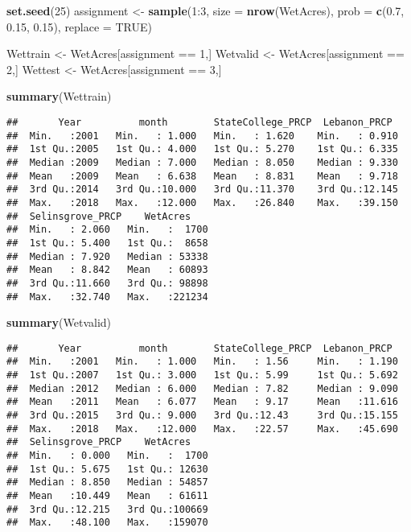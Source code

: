 \documentclass[]{article}
\newenvironment{Shaded}{\begin{snugshade}}{\end{snugshade}}
\newcommand{\KeywordTok}[1]{\textcolor[rgb]{0.13,0.29,0.53}{\textbf{{#1}}}}
\newcommand{\DataTypeTok}[1]{\textcolor[rgb]{0.13,0.29,0.53}{{#1}}}
\newcommand{\DecValTok}[1]{\textcolor[rgb]{0.00,0.00,0.81}{{#1}}}
\newcommand{\FloatTok}[1]{\textcolor[rgb]{0.00,0.00,0.81}{{#1}}}
\newcommand{\StringTok}[1]{\textcolor[rgb]{0.31,0.60,0.02}{{#1}}}
\newcommand{\OtherTok}[1]{\textcolor[rgb]{0.56,0.35,0.01}{{#1}}}
\newcommand{\NormalTok}[1]{{#1}}
\begin{document}
\begin{Shaded}
\begin{Highlighting}[]
\KeywordTok{set.seed}\NormalTok{(}\DecValTok{25}\NormalTok{)}
\NormalTok{assignment <-}\StringTok{ }\KeywordTok{sample}\NormalTok{(}\DecValTok{1}\NormalTok{:}\DecValTok{3}\NormalTok{, }\DataTypeTok{size =} \KeywordTok{nrow}\NormalTok{(WetAcres), }\DataTypeTok{prob =} \KeywordTok{c}\NormalTok{(}\FloatTok{0.7}\NormalTok{, }\FloatTok{0.15}\NormalTok{, }\FloatTok{0.15}\NormalTok{), }\DataTypeTok{replace =} \OtherTok{TRUE}\NormalTok{)}

\NormalTok{Wettrain <-}\StringTok{ }\NormalTok{WetAcres[assignment ==}\StringTok{ }\DecValTok{1}\NormalTok{,]}
\NormalTok{Wetvalid <-}\StringTok{ }\NormalTok{WetAcres[assignment ==}\StringTok{ }\DecValTok{2}\NormalTok{,]}
\NormalTok{Wettest <-}\StringTok{ }\NormalTok{WetAcres[assignment ==}\StringTok{ }\DecValTok{3}\NormalTok{,]}

\KeywordTok{summary}\NormalTok{(Wettrain)}
\end{Highlighting}
\end{Shaded}

\begin{verbatim}
##       Year          month        StateCollege_PRCP  Lebanon_PRCP   
##  Min.   :2001   Min.   : 1.000   Min.   : 1.620    Min.   : 0.910  
##  1st Qu.:2005   1st Qu.: 4.000   1st Qu.: 5.270    1st Qu.: 6.335  
##  Median :2009   Median : 7.000   Median : 8.050    Median : 9.330  
##  Mean   :2009   Mean   : 6.638   Mean   : 8.831    Mean   : 9.718  
##  3rd Qu.:2014   3rd Qu.:10.000   3rd Qu.:11.370    3rd Qu.:12.145  
##  Max.   :2018   Max.   :12.000   Max.   :26.840    Max.   :39.150  
##  Selinsgrove_PRCP    WetAcres     
##  Min.   : 2.060   Min.   :  1700  
##  1st Qu.: 5.400   1st Qu.:  8658  
##  Median : 7.920   Median : 53338  
##  Mean   : 8.842   Mean   : 60893  
##  3rd Qu.:11.660   3rd Qu.: 98898  
##  Max.   :32.740   Max.   :221234
\end{verbatim}

\begin{Shaded}
\begin{Highlighting}[]
\KeywordTok{summary}\NormalTok{(Wetvalid)}
\end{Highlighting}
\end{Shaded}

\begin{verbatim}
##       Year          month        StateCollege_PRCP  Lebanon_PRCP   
##  Min.   :2001   Min.   : 1.000   Min.   : 1.56     Min.   : 1.190  
##  1st Qu.:2007   1st Qu.: 3.000   1st Qu.: 5.99     1st Qu.: 5.692  
##  Median :2012   Median : 6.000   Median : 7.82     Median : 9.090  
##  Mean   :2011   Mean   : 6.077   Mean   : 9.17     Mean   :11.616  
##  3rd Qu.:2015   3rd Qu.: 9.000   3rd Qu.:12.43     3rd Qu.:15.155  
##  Max.   :2018   Max.   :12.000   Max.   :22.57     Max.   :45.690  
##  Selinsgrove_PRCP    WetAcres     
##  Min.   : 0.000   Min.   :  1700  
##  1st Qu.: 5.675   1st Qu.: 12630  
##  Median : 8.850   Median : 54857  
##  Mean   :10.449   Mean   : 61611  
##  3rd Qu.:12.215   3rd Qu.:100669  
##  Max.   :48.100   Max.   :159070
\end{verbatim}
\end{document}

